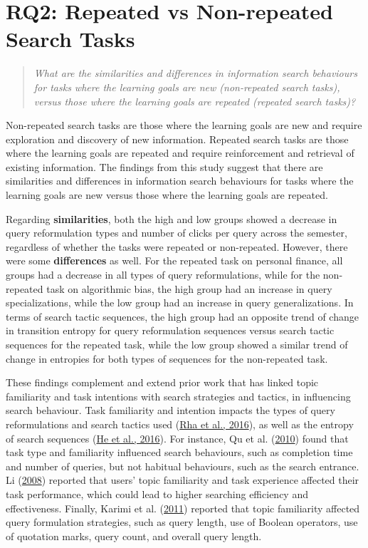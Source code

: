 \documentclass[letterpaper, nobind]{templates/ociamthesis}
\begin{document}
\hypertarget{rq2-repeated-vs-non-repeated-search-tasks}{%
\section{RQ2: Repeated vs Non-repeated Search Tasks}\label{rq2-repeated-vs-non-repeated-search-tasks}}

\begin{quote}
\emph{What are the similarities and differences in information search behaviours for tasks where the learning goals are new (non-repeated search tasks), versus those where the learning goals are repeated (repeated search tasks)?}
\end{quote}

Non-repeated search tasks are those where the learning goals are new and require exploration and discovery of new information.
Repeated search tasks are those where the learning goals are repeated and require reinforcement and retrieval of existing information.
The findings from this study suggest that there are similarities and differences in information search behaviours for tasks where the learning goals are new versus those where the learning goals are repeated.

Regarding \textbf{similarities}, both the high and low groups showed a decrease in query reformulation types and number of clicks per query across the semester, regardless of whether the tasks were repeated or non-repeated.
However, there were some \textbf{differences} as well.
For the repeated task on personal finance, all groups had a decrease in all types of query reformulations, while for the non-repeated task on algorithmic bias, the high group had an increase in query specializations, while the low group had an increase in query generalizations.
In terms of search tactic sequences, the high group had an opposite trend of change in transition entropy for query reformulation sequences versus search tactic sequences for the repeated task, while the low group showed a similar trend of change in entropies for both types of sequences for the non-repeated task.

These findings complement and extend prior work that has linked topic familiarity and task intentions with search strategies and tactics, in influencing search behaviour.
Task familiarity and intention impacts the types of query reformulations and search tactics used (\protect\hyperlink{ref-rha2016exploring}{Rha et al., 2016}), as well as the entropy of search sequences (\protect\hyperlink{ref-he2016beyond}{He et al., 2016}).
For instance, Qu et al. (\protect\hyperlink{ref-qu2010effect}{2010}) found that task type and familiarity influenced search behaviours, such as completion time and number of queries, but not habitual behaviours, such as the search entrance.
Li (\protect\hyperlink{ref-li2008relationships}{2008}) reported that users' topic familiarity and task experience affected their task performance, which could lead to higher searching efficiency and effectiveness.
Finally, Karimi et al. (\protect\hyperlink{ref-karimi2011domain}{2011}) reported that topic familiarity affected query formulation strategies, such as query length, use of Boolean operators, use of quotation marks, query count, and overall query length.
\end{document}
